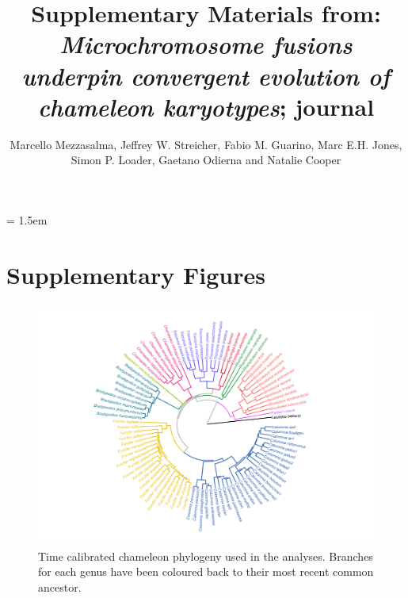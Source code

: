 \documentclass[a4paper, 12pt]{article}
\title{Supplementary Materials from: \textit{Microchromosome fusions underpin convergent evolution of chameleon karyotypes}; journal}
\author{Marcello Mezzasalma, Jeffrey W. Streicher, Fabio M. Guarino, Marc E.H. Jones,\\ 
Simon P. Loader, Gaetano Odierna and Natalie Cooper}
\date{}
\begin{document}
\maketitle

\tableofcontents

\parindent = 1.5em
\addtolength{\parskip}{.3em}


\newpage
\section{Supplementary Figures}

\begin{figure}[h]
 \centering
  \includegraphics[width = \linewidth]{figures/trees-genera-colour.png}
  \caption{Time calibrated chameleon phylogeny used in the analyses. 
  Branches for each genus have been coloured back to their most recent common ancestor.
}
  \label{fig-phylo}
\end{figure}
\end{document}
